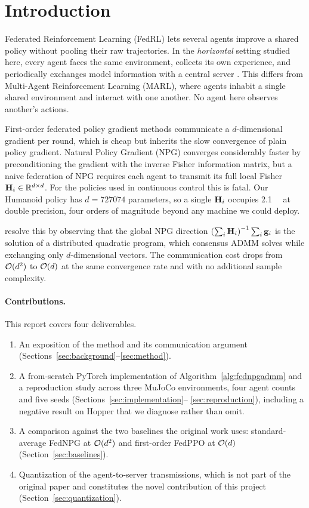 \section{Introduction}
\label{sec:introduction}

Federated Reinforcement Learning (FedRL) lets several agents improve a shared
policy without pooling their raw trajectories. In the \emph{horizontal}
setting studied here, every agent faces the same environment, collects its own
experience, and periodically exchanges model information with a central server
\citep{qi2021fedrlsurvey}. This differs from Multi-Agent Reinforcement Learning (MARL), where agents
inhabit a single shared environment and interact with one another. No agent
here observes another's actions.

First-order federated policy gradient methods communicate a $d$-dimensional
gradient per round, which is cheap but inherits the slow convergence of plain
policy gradient. Natural Policy Gradient (NPG) converges considerably faster
by preconditioning the gradient with the inverse Fisher information matrix,
but a naive federation of NPG requires each agent to transmit its full local
Fisher $\mathbf{H}_i \in \mathbb{R}^{d \times d}$. For the policies used in continuous
control this is fatal. Our Humanoid policy has $d = \num{727074}$ parameters,
so a single $\mathbf{H}_i$ occupies \SI{2.1}{\peta\byte} at double precision, four
orders of magnitude beyond any machine we could deploy.

\citet{lan2023fednpgadmm} resolve this by observing that the global NPG direction
$\left(\sum_i \mathbf{H}_i\right)^{-1}\sum_i \mathbf{g}_i$ is the solution of a distributed
quadratic program, which consensus ADMM solves while exchanging only
$d$-dimensional vectors. The communication cost drops from $\mathcal{O}(d^2)$ to
$\mathcal{O}(d)$ at the same convergence rate and with no additional sample
complexity.

\paragraph{Contributions.} This report covers four deliverables.
\begin{enumerate}
  \item An exposition of the method and its communication argument
        (Sections~\ref{sec:background}--\ref{sec:method}).
  \item A from-scratch PyTorch implementation of Algorithm~\ref{alg:fednpgadmm}
        and a reproduction study across three MuJoCo environments, four agent
        counts and five seeds (Sections~\ref{sec:implementation}--%
        \ref{sec:reproduction}), including a negative result on Hopper that we
        diagnose rather than omit.
  \item A comparison against the two baselines the original work uses:
        standard-average FedNPG at $\mathcal{O}(d^2)$ and first-order FedPPO at
        $\mathcal{O}(d)$ (Section~\ref{sec:baselines}).
  \item Quantization of the agent-to-server transmissions, which is not part of
        the original paper and constitutes the novel contribution of this
        project (Section~\ref{sec:quantization}).
\end{enumerate}

